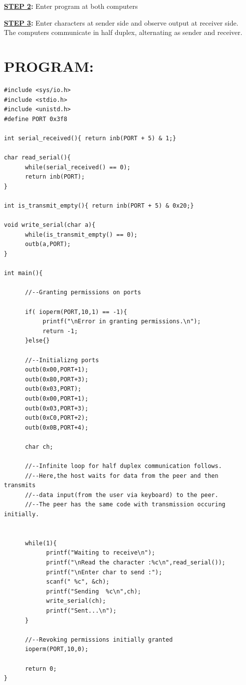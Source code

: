 \documentclass[a4paper,28pt]{report}
\begin{document}
\textbf{\underline{STEP 2}:} Enter program at both computers

\textbf{\underline{STEP 3}:} Enter characters at sender side and observe output at receiver side. The computers  \hspace*{48pt}communicate in half duplex, alternating as sender and receiver.

\section*{PROGRAM:}
\begin{lstlisting}
#include <sys/io.h>
#include <stdio.h>
#include <unistd.h>
#define PORT 0x3f8

int serial_received(){ return inb(PORT + 5) & 1;}

char read_serial(){
      while(serial_received() == 0);
      return inb(PORT);
}

int is_transmit_empty(){ return inb(PORT + 5) & 0x20;}

void write_serial(char a){
      while(is_transmit_empty() == 0);
      outb(a,PORT);
}

int main(){

      //--Granting permissions on ports
      
      if( ioperm(PORT,10,1) == -1){
           printf("\nError in granting permissions.\n");
           return -1;
      }else{}
      
      //--Initializng ports
      outb(0x00,PORT+1);
      outb(0x80,PORT+3);
      outb(0x03,PORT);
      outb(0x00,PORT+1);
      outb(0x03,PORT+3);
      outb(0xC0,PORT+2);
      outb(0x0B,PORT+4);
      
      char ch;
      
      //--Infinite loop for half duplex communication follows.
      //--Here,the host waits for data from the peer and then transmits
      //--data input(from the user via keyboard) to the peer.
      //--The peer has the same code with transmission occuring initially.
      
      
      while(1){
            printf("Waiting to receive\n");
            printf("\nRead the character :%c\n",read_serial());
            printf("\nEnter char to send :");
            scanf(" %c", &ch);
            printf("Sending  %c\n",ch);
            write_serial(ch);
            printf("Sent...\n");
      }
      
      //--Revoking permissions initially granted
      ioperm(PORT,10,0);
      
      return 0;
}
\end{lstlisting}
\end{document}
